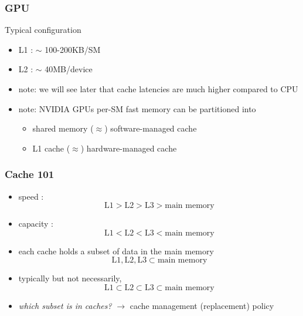 \documentclass[12pt,dvipdfmx]{beamer}
\newcommand{\ao}[1]{{\color{blue}#1}}
\begin{document}
\begin{frame}
\frametitle{GPU}

Typical configuration
\begin{itemize}
\item L1 : $\sim$ 100-200KB/SM
\item L2 : $\sim$ 40MB/device

\item note:
  we will see later that cache latencies are much higher compared to CPU
  
\item note: NVIDIA GPUs per-SM fast memory can be partitioned into
  \begin{itemize}
  \item shared memory ($\approx$) software-managed cache
  \item L1 cache ($\approx$) hardware-managed cache
  \end{itemize}
  
\end{itemize}
\end{frame}


\begin{frame}
\frametitle{Cache 101}
\begin{itemize}
\item<1-> speed : 
\[ \mbox{L1} > \mbox{L2} > \mbox{L3} > \mbox{main memory} \]
\item<2-> capacity :
\[ \mbox{L1} < \mbox{L2} < \mbox{L3} < \mbox{main memory} \]
\item<3-> each cache holds a subset of data in the main memory
\[ \mbox{L1}, \mbox{L2}, \mbox{L3} \subset \mbox{main memory} \]
\item<4-> typically but not necessarily, 
  \[ \mbox{} \mbox{L1} \subset \mbox{L2} \subset \mbox{L3} \subset \mbox{main memory} \]
\item<5-> \ao{\em which subset is in caches?} 
  $\rightarrow$ cache management (replacement) policy
\end{itemize}
\end{frame}
\end{document}
